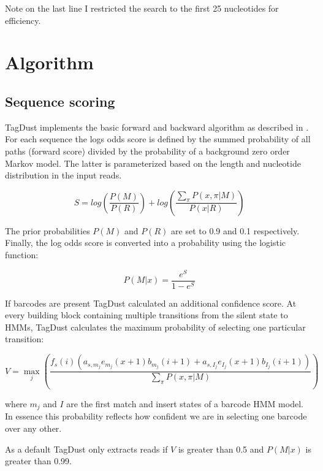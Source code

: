 \documentclass[11pt,a4paper,oneside]{book}
\begin{document}
Note on the last line I restricted the search to the first 25 nucleotides for efficiency. 

\chapter{Algorithm}

\section{Sequence scoring} 

TagDust implements the basic forward and backward algorithm as described in \citep{durbin}. For each sequence the logs odds score is defined by the summed probability of all paths (forward score) divided by the probability of a background zero order Markov model. The latter is parameterized based on the length and nucleotide distribution in the input reads. 

\begin{equation}
	S  = log \left(  \frac{P(M)}{P(R)} \right) + log \left(\frac{\sum\limits_{\pi} P(x,\pi | M )}{P(x | R ) } \right)
\end{equation}

The prior probabilities $P(M)$ and  $P(R)$ are set to 0.9 and 0.1 respectively. Finally, the log odds score is converted into a probability using the logistic function:

\begin{equation}
	P(M | x) = \frac{e^S}{1-e^S}
\end{equation}

If barcodes are present TagDust calculated an additional confidence score. At every building block containing multiple transitions from the silent state to HMMs, TagDust calculates the maximum probability of selecting one particular transition:       


\begin{equation}
	V = \max_j \left( \frac{f_s(i)  ( a_{s,m_j} e_{m_j}(x+1) b_{m_j}(i+1)+  a_{s,I_j} e_{I_j}(x+1) b_{I_j}(i+1))}{\sum\limits_{\pi} P(x,\pi | M )}\right)
\end{equation}

where $m_j$ and $I$ are the first match and insert states of a barcode HMM model. In essence this probability reflects how confident we are in selecting one barcode over any other. 

As a default TagDust only extracts reads if $V$ is greater than 0.5 and $P(M | x)$ is greater than 0.99. 
\end{document}

